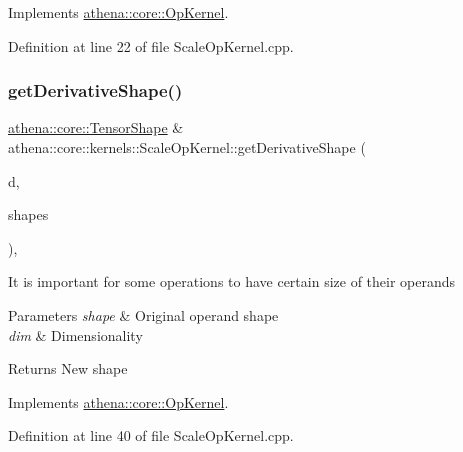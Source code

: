 Implements \mbox{\hyperlink{classathena_1_1core_1_1_op_kernel_ad500db1afc5a7c10acff8ecb8f1bee4d}{athena\+::core\+::\+Op\+Kernel}}.



Definition at line 22 of file Scale\+Op\+Kernel.\+cpp.

\mbox{\label{classathena_1_1core_1_1kernels_1_1_scale_op_kernel_ad7c63973c62e28c0ad3d854ce16debf1}} 
\subsubsection{\texorpdfstring{get\+Derivative\+Shape()}{getDerivativeShape()}}
{\footnotesize\ttfamily \mbox{\hyperlink{classathena_1_1core_1_1_tensor_shape}{athena\+::core\+::\+Tensor\+Shape}} \& athena\+::core\+::kernels\+::\+Scale\+Op\+Kernel\+::get\+Derivative\+Shape (\begin{DoxyParamCaption}\item[{int}]{d,  }\item[{std\+::vector$<$ \mbox{\hyperlink{classathena_1_1core_1_1_tensor_shape}{athena\+::core\+::\+Tensor\+Shape}} $>$ \&}]{shapes }\end{DoxyParamCaption})\hspace{0.3cm}{\ttfamily [override]}, {\ttfamily [virtual]}}

It is important for some operations to have certain size of their operands 
\begin{DoxyParams}{Parameters}
{\em shape} & Original operand shape \\
\hline
{\em dim} & Dimensionality \\
\hline
\end{DoxyParams}
\begin{DoxyReturn}{Returns}
New shape 
\end{DoxyReturn}


Implements \mbox{\hyperlink{classathena_1_1core_1_1_op_kernel_ad95af6dd184ce7ee9182ec7ca54b6c4d}{athena\+::core\+::\+Op\+Kernel}}.



Definition at line 40 of file Scale\+Op\+Kernel.\+cpp.

